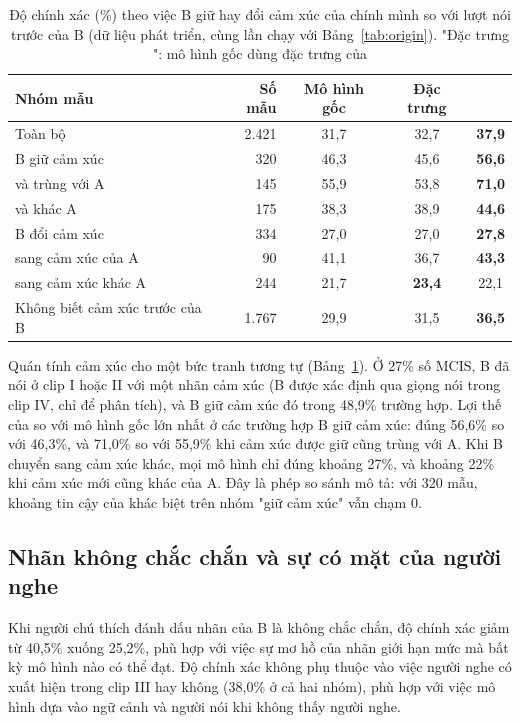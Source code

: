 \begin{table}[!htb]
\centering
\caption{Độ chính xác (\%) theo việc B giữ hay đổi cảm xúc của chính mình so với lượt nói trước của B (dữ liệu phát triển, cùng lần chạy với Bảng~\ref{tab:origin}). "Đặc trưng \model{}": mô hình gốc dùng đặc trưng của \model{}}
\label{tab:keep}
\begin{tabular}{lrccc}
\toprule
Nhóm mẫu & Số mẫu & Mô hình gốc & Đặc trưng \model{} & \model{} \\
\midrule
Toàn bộ & 2.421 & 31,7 & 32,7 & \textbf{37,9} \\
B giữ cảm xúc & 320 & 46,3 & 45,6 & \textbf{56,6} \\
\quad và trùng với A & 145 & 55,9 & 53,8 & \textbf{71,0} \\
\quad và khác A & 175 & 38,3 & 38,9 & \textbf{44,6} \\
B đổi cảm xúc & 334 & 27,0 & 27,0 & \textbf{27,8} \\
\quad sang cảm xúc của A & 90 & 41,1 & 36,7 & \textbf{43,3} \\
\quad sang cảm xúc khác A & 244 & 21,7 & \textbf{23,4} & 22,1 \\
Không biết cảm xúc trước của B & 1.767 & 29,9 & 31,5 & \textbf{36,5} \\
\bottomrule
\end{tabular}
\end{table}

Quán tính cảm xúc cho một bức tranh tương tự (Bảng~\ref{tab:keep}). Ở 27\% số MCIS, B đã nói ở clip I hoặc II với một nhãn cảm xúc (B được xác định qua giọng nói trong clip IV, chỉ để phân tích), và B giữ cảm xúc đó trong 48,9\% trường hợp. Lợi thế của \model{} so với mô hình gốc lớn nhất ở các trường hợp B giữ cảm xúc: đúng 56,6\% so với 46,3\%, và 71,0\% so với 55,9\% khi cảm xúc được giữ cũng trùng với A. Khi B chuyển sang cảm xúc khác, mọi mô hình chỉ đúng khoảng 27\%, và khoảng 22\% khi cảm xúc mới cũng khác của A. Đây là phép so sánh mô tả: với 320 mẫu, khoảng tin cậy của khác biệt trên nhóm "giữ cảm xúc" vẫn chạm 0.

\subsection{Nhãn không chắc chắn và sự có mặt của người nghe}

Khi người chú thích đánh dấu nhãn của B là không chắc chắn, độ chính xác giảm từ 40,5\% xuống 25,2\%, phù hợp với việc sự mơ hồ của nhãn giới hạn mức mà bất kỳ mô hình nào có thể đạt. Độ chính xác không phụ thuộc vào việc người nghe có xuất hiện trong clip III hay không (38,0\% ở cả hai nhóm), phù hợp với việc mô hình dựa vào ngữ cảnh và người nói khi không thấy người nghe.

